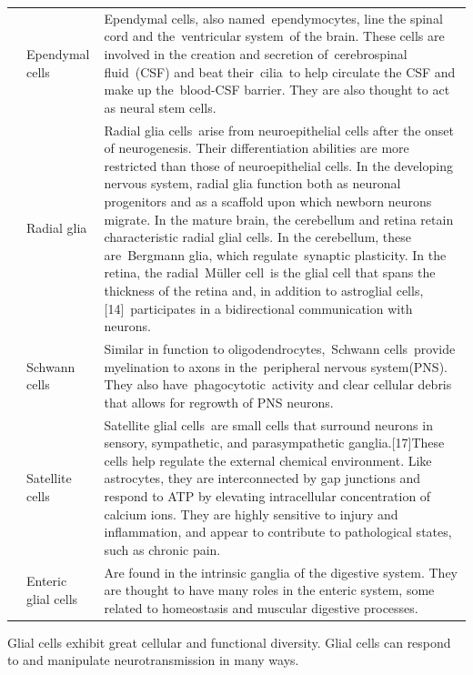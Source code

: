 \begin{longtable}[t]{>{\raggedright\arraybackslash}p{5em}>{\raggedright\arraybackslash}p{5em}>{\raggedright\arraybackslash}p{40em}}
 & Ependymal cells & Ependymal cells, also named ependymocytes, line the spinal cord and the ventricular system of the brain. These cells are involved in the creation and secretion of cerebrospinal fluid (CSF) and beat their cilia to help circulate the CSF and make up the blood-CSF barrier. They are also thought to act as neural stem cells.\\

\rowcolor{gray!6}  \multirow{-7}{5em}{\raggedright\arraybackslash CNS} & Radial glia & Radial glia cells arise from neuroepithelial cells after the onset of neurogenesis. Their differentiation abilities are more restricted than those of neuroepithelial cells. In the developing nervous system, radial glia function both as neuronal progenitors and as a scaffold upon which newborn neurons migrate. In the mature brain, the cerebellum and retina retain characteristic radial glial cells. In the cerebellum, these are Bergmann glia, which regulate synaptic plasticity. In the retina, the radial Müller cell is the glial cell that spans the thickness of the retina and, in addition to astroglial cells,[14] participates in a bidirectional communication with neurons.\\
\cmidrule{1-3}
 & Schwann cells & Similar in function to oligodendrocytes, Schwann cells provide myelination to axons in the peripheral nervous system(PNS). They also have phagocytotic activity and clear cellular debris that allows for regrowth of PNS neurons.\\

\rowcolor{gray!6}   & Satellite cells & Satellite glial cells are small cells that surround neurons in sensory, sympathetic, and parasympathetic ganglia.[17]These cells help regulate the external chemical environment. Like astrocytes, they are interconnected by gap junctions and respond to ATP by elevating intracellular concentration of calcium ions. They are highly sensitive to injury and inflammation, and appear to contribute to pathological states, such as chronic pain.\\

\multirow{-3}{5em}{\raggedright\arraybackslash PNS} & Enteric glial cells & Are found in the intrinsic ganglia of the digestive system. They are thought to have many roles in the enteric system, some related to homeostasis and muscular digestive processes.\\
\bottomrule
\end{longtable}

Glial cells exhibit great cellular and functional diversity. Glial cells can respond to and manipulate neurotransmission in many ways.

